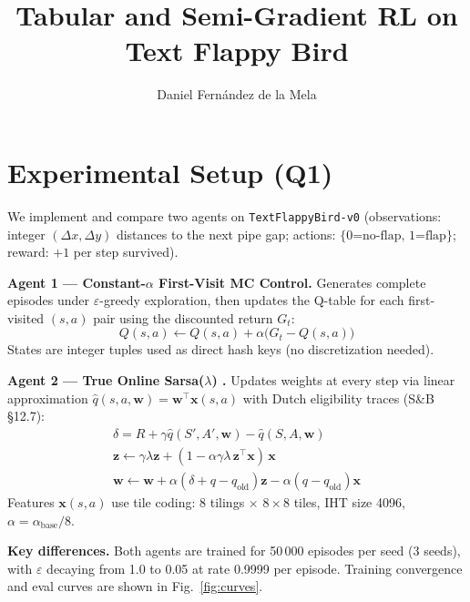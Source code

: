 \documentclass[runningheads]{llncs}
\begin{document}
\title{Tabular and Semi-Gradient RL on Text Flappy Bird}
\author{Daniel Fernández de la Mela}
\maketitle

\section{Experimental Setup (Q1)}

We implement and compare two agents on \texttt{TextFlappyBird-v0}
(observations: integer $(\Delta x, \Delta y)$ distances to the next pipe gap;
actions: $\{0\text{=no-flap},\,1\text{=flap}\}$; reward: $+1$ per step survived).

\textbf{Agent 1 — Constant-$\alpha$ First-Visit MC Control.}
Generates complete episodes under $\varepsilon$-greedy exploration, then updates
the Q-table for each first-visited $(s,a)$ pair using the discounted return $G_t$:
\begin{equation}
  Q(s,a) \leftarrow Q(s,a) + \alpha\bigl(G_t - Q(s,a)\bigr)
\end{equation}
States are integer tuples used as direct hash keys (no discretization needed).

\textbf{Agent 2 — True Online Sarsa($\lambda$) \cite{sutton2018}.}
Updates weights at every step via linear approximation
$\hat{q}(s,a,\mathbf{w})=\mathbf{w}^\top\mathbf{x}(s,a)$
with Dutch eligibility traces (S\&B §12.7):
\begin{gather}
  \delta = R + \gamma\hat{q}(S',A',\mathbf{w}) - \hat{q}(S,A,\mathbf{w}) \\
  \mathbf{z} \leftarrow \gamma\lambda\mathbf{z} + (1-\alpha\gamma\lambda\,\mathbf{z}^\top\mathbf{x})\,\mathbf{x} \\
  \mathbf{w} \leftarrow \mathbf{w} + \alpha(\delta+q-q_\text{old})\mathbf{z} - \alpha(q-q_\text{old})\mathbf{x}
\end{gather}
Features $\mathbf{x}(s,a)$ use tile coding: 8 tilings $\times$ $8{\times}8$ tiles,
IHT size 4096, $\alpha=\alpha_\text{base}/8$.

\textbf{Key differences.} Both agents are trained for 50\,000 episodes per seed
(3 seeds), with $\varepsilon$ decaying from 1.0 to 0.05 at rate 0.9999 per episode.
Training convergence and eval curves are shown in Fig.~\ref{fig:curves}.
\end{document}
